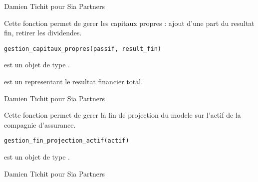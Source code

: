 \documentclass[a4paper]{book}
\begin{document}
%
\begin{Author}\relax
Damien Tichit pour Sia Partners
\end{Author}
%
\begin{Description}\relax
Cette fonction permet de gerer les capitaux propres : ajout d'une part du resultat fin, retirer les dividendes.
\end{Description}
%
\begin{Usage}
\begin{verbatim}
gestion_capitaux_propres(passif, result_fin)
\end{verbatim}
\end{Usage}
%
\begin{Arguments}
\begin{ldescription}
\item[\code{passif}] est un objet de type .

\item[\code{result\_fin}] est un  representant le resultat financier total.
\end{ldescription}
\end{Arguments}
%
\begin{Author}\relax
Damien Tichit pour Sia Partners
\end{Author}
%
\begin{Description}\relax
Cette fonction permet de gerer la fin de projection du modele sur l'actif de la compagnie d'assurance.
\end{Description}
%
\begin{Usage}
\begin{verbatim}
gestion_fin_projection_actif(actif)
\end{verbatim}
\end{Usage}
%
\begin{Arguments}
\begin{ldescription}
\item[\code{actif}] est un objet de type .
\end{ldescription}
\end{Arguments}
%
\begin{Author}\relax
Damien Tichit pour Sia Partners
\end{Author}
\end{document}
